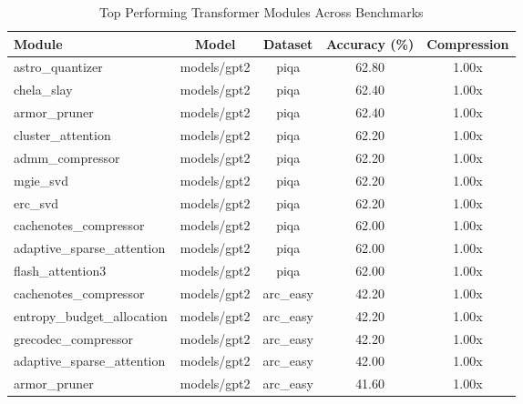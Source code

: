 \begin{table}[ht]
\centering
\small
\caption{Top Performing Transformer Modules Across Benchmarks}
\begin{tabular}{lcccc}
\toprule
Module & Model & Dataset & Accuracy (\%) & Compression \\
\midrule
astro\_quantizer & models/gpt2 & piqa & 62.80 & 1.00x \\
chela\_slay & models/gpt2 & piqa & 62.40 & 1.00x \\
armor\_pruner & models/gpt2 & piqa & 62.40 & 1.00x \\
cluster\_attention & models/gpt2 & piqa & 62.20 & 1.00x \\
admm\_compressor & models/gpt2 & piqa & 62.20 & 1.00x \\
mgie\_svd & models/gpt2 & piqa & 62.20 & 1.00x \\
erc\_svd & models/gpt2 & piqa & 62.20 & 1.00x \\
cachenotes\_compressor & models/gpt2 & piqa & 62.00 & 1.00x \\
adaptive\_sparse\_attention & models/gpt2 & piqa & 62.00 & 1.00x \\
flash\_attention3 & models/gpt2 & piqa & 62.00 & 1.00x \\
cachenotes\_compressor & models/gpt2 & arc_easy & 42.20 & 1.00x \\
entropy\_budget\_allocation & models/gpt2 & arc_easy & 42.20 & 1.00x \\
grecodec\_compressor & models/gpt2 & arc_easy & 42.20 & 1.00x \\
adaptive\_sparse\_attention & models/gpt2 & arc_easy & 42.00 & 1.00x \\
armor\_pruner & models/gpt2 & arc_easy & 41.60 & 1.00x \\
\bottomrule
\end{tabular}
\end{table}
